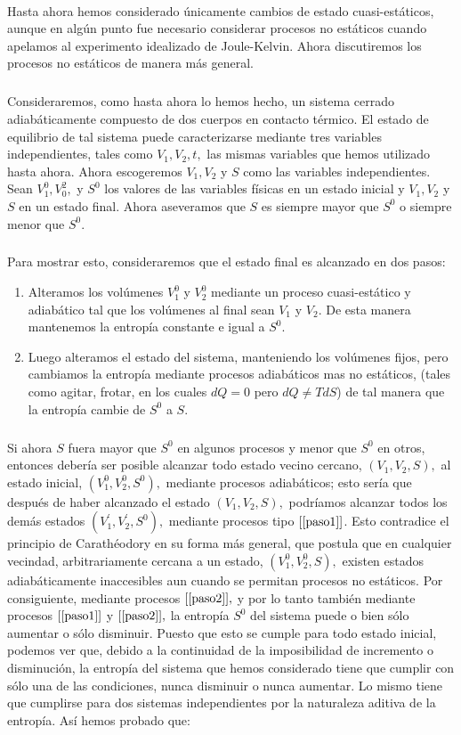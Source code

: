 \documentclass{article}
\theoremstyle{definition} \newtheorem{defi}{Definici\'on}
\theoremstyle{definition} \newtheorem{teo}{Teorema}
\theoremstyle{definition} \newtheorem{cor}{Corolario}
\begin{document}
\paragraph{}
Hasta ahora hemos considerado \'unicamente cambios de estado cuasi-est\'aticos, aunque en alg\'un punto fue necesario considerar procesos no est\'aticos cuando apelamos al experimento idealizado de Joule-Kelvin. Ahora discutiremos los procesos no est\'aticos de manera m\'as general.
\subparagraph{}
Consideraremos, como hasta ahora lo hemos hecho, un sistema cerrado adiab\'aticamente compuesto de dos cuerpos en contacto t\'ermico. El estado de equilibrio de tal sistema puede caracterizarse mediante tres variables independientes, tales como $V_1,V_2,t,$ las mismas variables que hemos utilizado hasta ahora. Ahora escogeremos $V_1,V_2$ y $S$ como las variables independientes. Sean $V^0_1,V^2_0,$ y $S^0$ los valores de las variables f\'isicas en un estado inicial y $V_1,V_2$ y $S$ en un estado final. Ahora aseveramos que $S$ es siempre mayor que $S^0$ o siempre menor que $S^0.$
\subparagraph{}
Para mostrar esto, consideraremos que el estado final es alcanzado en dos pasos:
\begin{enumerate}
\item Alteramos los vol\'umenes $V^0_1$ y $V^0_2$ mediante un proceso cuasi-est\'atico y adiab\'atico tal que los vol\'umenes al final sean $V_1$ y $V_2.$ De esta manera mantenemos la entrop\'ia constante e igual a $S^0.$\label{paso1}
\item Luego alteramos el estado del sistema, manteniendo los vol\'umenes fijos, pero cambiamos la entrop\'ia mediante procesos adiab\'aticos mas no est\'aticos, (tales como agitar, frotar, en los cuales $dQ=0$ pero $dQ\neq TdS$) de tal manera que la entrop\'ia cambie de $S^0$ a $S.$\label{paso2}
\end{enumerate}
\subparagraph{}
Si ahora $S$ fuera mayor que $S^0$ en algunos procesos y menor que $S^0$ en otros, entonces deber\'ia ser posible alcanzar todo estado vecino cercano, $(V_1,V_2,S),$ al estado inicial, $(V^0_1,V^0_2,S^0),$ mediante procesos adiab\'aticos; esto ser\'ia que despu\'es de haber alcanzado el estado $(V_1,V_2,S),$ podr\'iamos alcanzar todos los dem\'as estados $(V^{\prime}_1,V^{\prime}_2,S^0),$ mediante procesos tipo $[\ref{paso1}]$. Esto contradice el principio de Carath\'eodory en su forma m\'as general, que postula que en cualquier vecindad, arbitrariamente cercana a un estado, $(V^0_1,V^0_2,S),$ existen estados adiab\'aticamente inaccesibles aun cuando se permitan procesos no est\'aticos. Por consiguiente, mediante procesos $[\ref{paso2}],$ y por lo tanto tambi\'en mediante procesos $[\ref{paso1}]$ y $[\ref{paso2}],$ la entrop\'ia $S^0$ del sistema puede o bien s\'olo aumentar o s\'olo disminuir. Puesto que esto se cumple para todo estado inicial, podemos ver que, debido a la continuidad de la imposibilidad de incremento o disminuci\'on, la entrop\'ia del sistema que hemos considerado tiene que cumplir con s\'olo una de las condiciones, nunca disminuir o nunca aumentar. Lo mismo tiene que cumplirse para dos sistemas independientes por la naturaleza aditiva de la entrop\'ia. As\'i hemos probado que:
\end{document}
